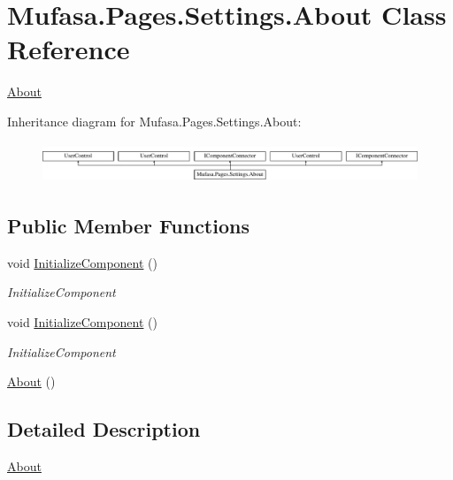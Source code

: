 \hypertarget{class_mufasa_1_1_pages_1_1_settings_1_1_about}{\section{Mufasa.\+Pages.\+Settings.\+About Class Reference}
\label{class_mufasa_1_1_pages_1_1_settings_1_1_about}
}


\hyperlink{class_mufasa_1_1_pages_1_1_settings_1_1_about}{About}  


Inheritance diagram for Mufasa.\+Pages.\+Settings.\+About\+:\begin{figure}[H]
\begin{center}
\leavevmode
\includegraphics[height=1.204301cm]{class_mufasa_1_1_pages_1_1_settings_1_1_about}
\end{center}
\end{figure}
\subsection*{Public Member Functions}
\begin{DoxyCompactItemize}
\item 
void \hyperlink{class_mufasa_1_1_pages_1_1_settings_1_1_about_a62ab76a47a9a517c4c70eaa10c9886db}{Initialize\+Component} ()
\begin{DoxyCompactList}\small\item\em Initialize\+Component \end{DoxyCompactList}\item 
void \hyperlink{class_mufasa_1_1_pages_1_1_settings_1_1_about_a62ab76a47a9a517c4c70eaa10c9886db}{Initialize\+Component} ()
\begin{DoxyCompactList}\small\item\em Initialize\+Component \end{DoxyCompactList}\item 
\hyperlink{class_mufasa_1_1_pages_1_1_settings_1_1_about_a8f7bb6c09f405d0ee37c080198e2e0b0}{About} ()
\end{DoxyCompactItemize}


\subsection{Detailed Description}
\hyperlink{class_mufasa_1_1_pages_1_1_settings_1_1_about}{About} 

